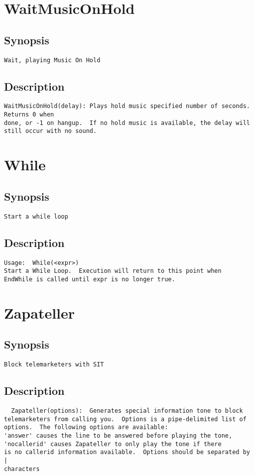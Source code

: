 \section{WaitMusicOnHold}
\subsection{Synopsis}
\begin{verbatim}
Wait, playing Music On Hold
\end{verbatim}
\subsection{Description}
\begin{verbatim}
WaitMusicOnHold(delay): Plays hold music specified number of seconds.  Returns 0 when
done, or -1 on hangup.  If no hold music is available, the delay will
still occur with no sound.

\end{verbatim}


\section{While}
\subsection{Synopsis}
\begin{verbatim}
Start a while loop
\end{verbatim}
\subsection{Description}
\begin{verbatim}
Usage:  While(<expr>)
Start a While Loop.  Execution will return to this point when
EndWhile is called until expr is no longer true.

\end{verbatim}


\section{Zapateller}
\subsection{Synopsis}
\begin{verbatim}
Block telemarketers with SIT
\end{verbatim}
\subsection{Description}
\begin{verbatim}
  Zapateller(options):  Generates special information tone to block
telemarketers from calling you.  Options is a pipe-delimited list of
options.  The following options are available:
'answer' causes the line to be answered before playing the tone,
'nocallerid' causes Zapateller to only play the tone if there
is no callerid information available.  Options should be separated by |
characters

\end{verbatim}


